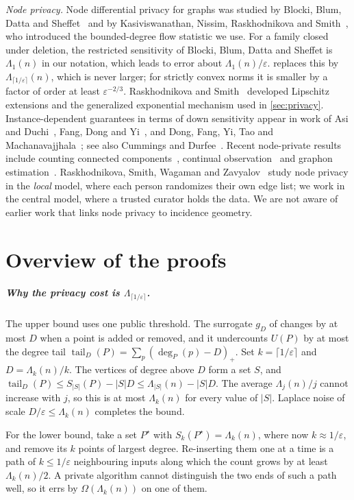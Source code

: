 \documentclass[anonymous,a4paper,USenglish,cleveref,autoref,thm-restate]{socg-lipics-v2021}
\newcommand{\eps}{\varepsilon}
\newcommand{\Lam}{\Lambda}
\newcommand{\tail}{\operatorname{tail}}
\begin{document}
\emph{Node privacy.} Node differential privacy for graphs was studied by Blocki, Blum, Datta and Sheffet~\cite{BBDS13} and by Kasiviswanathan, Nissim, Raskhodnikova and Smith~\cite{KNRS13}, who introduced the bounded-degree flow statistic we use. For a family closed under deletion, the restricted sensitivity of Blocki, Blum, Datta and Sheffet is $\Lam_1(n)$ in our notation, which leads to error about $\Lam_1(n)/\eps$.  replaces this by $\Lam_{\lceil 1/\eps\rceil}(n)$, which is never larger; for strictly convex norms it is smaller by a factor of order at least $\eps^{-2/3}$. Raskhodnikova and Smith~\cite{RS16} developed Lipschitz extensions and the generalized exponential mechanism used in \cref{sec:privacy}. Instance-dependent guarantees in terms of down sensitivity appear in work of Asi and Duchi~\cite{AsiDuchi20}, Fang, Dong and Yi~\cite{FDY22}, and Dong, Fang, Yi, Tao and Machanavajjhala~\cite{R2T22}; see also Cummings and Durfee~\cite{CummingsDurfee20}. Recent node-private results include counting connected components~\cite{KalemajRST23}, continual observation~\cite{JainSmithWagaman24} and graphon estimation~\cite{ChenEtAl24Graphon}. Raskhodnikova, Smith, Wagaman and Zavyalov~\cite{RSWZ26} study node privacy in the \emph{local} model, where each person randomizes their own edge list; we work in the central model, where a trusted curator holds the data. We are not aware of earlier work that links node privacy to incidence geometry.

\section{Overview of the proofs}
\label{sec:overview}

\subparagraph*{Why the privacy cost is $\Lam_{\lceil 1/\eps\rceil}$.}
The upper bound uses one public threshold. The surrogate $g_D$ of \cite{KNRS13} changes by at most $D$ when a point is added or removed, and it undercounts $U(P)$ by at most the degree tail $\tail_D(P)=\sum_p(\deg_P(p)-D)_+$. Set $k=\lceil1/\eps\rceil$ and $D=\Lam_k(n)/k$. The vertices of degree above $D$ form a set $S$, and $\tail_D(P)\le S_{|S|}(P)-|S|D\le\Lam_{|S|}(n)-|S|D$. The average $\Lam_j(n)/j$ cannot increase with $j$, so this is at most $\Lam_k(n)$ for every value of $|S|$. Laplace noise of scale $D/\eps\le\Lam_k(n)$ completes the bound.

For the lower bound, take a set $P^\star$ with $S_k(P^\star)=\Lam_k(n)$, where now $k\approx 1/\eps$, and remove its $k$ points of largest degree. Re-inserting them one at a time is a path of $k\le1/\eps$ neighbouring inputs along which the count grows by at least $\Lam_k(n)/2$. A private algorithm cannot distinguish the two ends of such a path well, so it errs by $\Omega(\Lam_k(n))$ on one of them.
\end{document}
